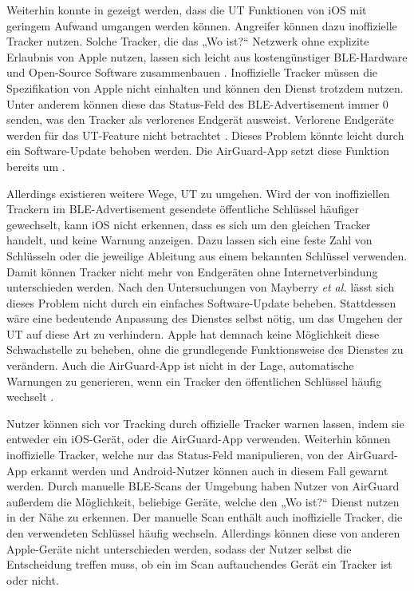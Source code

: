 Weiterhin konnte in \cite{Heinrich_AirGuard,Mayberry_Tracking} gezeigt werden, dass die \ac{UT} Funktionen von iOS mit geringem Aufwand umgangen werden können.
Angreifer können dazu inoffizielle Tracker nutzen.
Solche Tracker, die das „Wo ist?“ Netzwerk ohne explizite Erlaubnis von Apple nutzen, lassen sich leicht aus kostengünstiger \ac{BLE}-Hardware und Open-Source Software zusammenbauen \cite{Heinrich,Heinrich_OpenHaystack,Mayberry_Tracking,Heinrich_AirGuard}.
Inoffizielle Tracker müssen die Spezifikation von Apple nicht einhalten und können den Dienst trotzdem nutzen.
Unter anderem können diese das Status-Feld des \ac{BLE}-Advertisement immer 0 senden, was den Tracker als verlorenes Endgerät ausweist.
Verlorene Endgeräte werden für das \ac{UT}-Feature nicht betrachtet \cite{Heinrich_AirGuard,Mayberry_Tracking}.
Dieses Problem könnte leicht durch ein Software-Update behoben werden.
Die AirGuard-App setzt diese Funktion bereits um \cite{Heinrich_AirGuard}.

Allerdings existieren weitere Wege, \ac{UT} zu umgehen.
Wird der von inoffiziellen Trackern im \ac{BLE}-Advertisement gesendete öffentliche Schlüssel häufiger gewechselt, kann iOS nicht erkennen, dass es sich um den gleichen Tracker handelt, und keine Warnung anzeigen.
Dazu lassen sich eine feste Zahl von Schlüsseln oder die jeweilige Ableitung aus einem bekannten Schlüssel verwenden.
Damit können Tracker nicht mehr von Endgeräten ohne Internetverbindung unterschieden werden.
Nach den Untersuchungen von Mayberry \textit{et al.} \cite{Mayberry_Tracking} lässt sich dieses Problem nicht durch ein einfaches Software-Update beheben.
Stattdessen wäre eine bedeutende Anpassung des Dienstes selbst nötig, um das Umgehen der \ac{UT} auf diese Art zu verhindern.
Apple hat demnach keine Möglichkeit diese Schwachstelle zu beheben, ohne die grundlegende Funktionsweise des Dienstes zu verändern.
Auch die AirGuard-App ist nicht in der Lage, automatische Warnungen zu generieren, wenn ein Tracker den öffentlichen Schlüssel häufig wechselt \cite{Heinrich_AirGuard}.

Nutzer können sich vor Tracking durch offizielle Tracker warnen lassen, indem sie entweder ein iOS-Gerät, oder die AirGuard-App verwenden.
Weiterhin können inoffizielle Tracker, welche nur das Status-Feld manipulieren, von der AirGuard-App erkannt werden und Android-Nutzer können auch in diesem Fall gewarnt werden.
Durch manuelle \ac{BLE}-Scans der Umgebung haben Nutzer von AirGuard außerdem die Möglichkeit, beliebige Geräte, welche den „Wo ist?“ Dienst nutzen in der Nähe zu erkennen.
Der manuelle Scan enthält auch inoffizielle Tracker, die den verwendeten Schlüssel häufig wechseln.
Allerdings können diese von anderen Apple-Geräte nicht unterschieden werden, sodass der Nutzer selbst die Entscheidung treffen muss, ob ein im Scan auftauchendes Gerät ein Tracker ist oder nicht.

